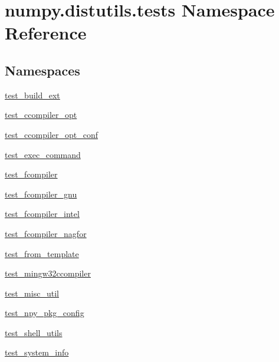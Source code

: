 \hypertarget{namespacenumpy_1_1distutils_1_1tests}{}\section{numpy.\+distutils.\+tests Namespace Reference}
\label{namespacenumpy_1_1distutils_1_1tests}
\subsection*{Namespaces}
\begin{DoxyCompactItemize}
\item 
 \hyperlink{namespacenumpy_1_1distutils_1_1tests_1_1test__build__ext}{test\+\_\+build\+\_\+ext}
\item 
 \hyperlink{namespacenumpy_1_1distutils_1_1tests_1_1test__ccompiler__opt}{test\+\_\+ccompiler\+\_\+opt}
\item 
 \hyperlink{namespacenumpy_1_1distutils_1_1tests_1_1test__ccompiler__opt__conf}{test\+\_\+ccompiler\+\_\+opt\+\_\+conf}
\item 
 \hyperlink{namespacenumpy_1_1distutils_1_1tests_1_1test__exec__command}{test\+\_\+exec\+\_\+command}
\item 
 \hyperlink{namespacenumpy_1_1distutils_1_1tests_1_1test__fcompiler}{test\+\_\+fcompiler}
\item 
 \hyperlink{namespacenumpy_1_1distutils_1_1tests_1_1test__fcompiler__gnu}{test\+\_\+fcompiler\+\_\+gnu}
\item 
 \hyperlink{namespacenumpy_1_1distutils_1_1tests_1_1test__fcompiler__intel}{test\+\_\+fcompiler\+\_\+intel}
\item 
 \hyperlink{namespacenumpy_1_1distutils_1_1tests_1_1test__fcompiler__nagfor}{test\+\_\+fcompiler\+\_\+nagfor}
\item 
 \hyperlink{namespacenumpy_1_1distutils_1_1tests_1_1test__from__template}{test\+\_\+from\+\_\+template}
\item 
 \hyperlink{namespacenumpy_1_1distutils_1_1tests_1_1test__mingw32ccompiler}{test\+\_\+mingw32ccompiler}
\item 
 \hyperlink{namespacenumpy_1_1distutils_1_1tests_1_1test__misc__util}{test\+\_\+misc\+\_\+util}
\item 
 \hyperlink{namespacenumpy_1_1distutils_1_1tests_1_1test__npy__pkg__config}{test\+\_\+npy\+\_\+pkg\+\_\+config}
\item 
 \hyperlink{namespacenumpy_1_1distutils_1_1tests_1_1test__shell__utils}{test\+\_\+shell\+\_\+utils}
\item 
 \hyperlink{namespacenumpy_1_1distutils_1_1tests_1_1test__system__info}{test\+\_\+system\+\_\+info}
\end{DoxyCompactItemize}
